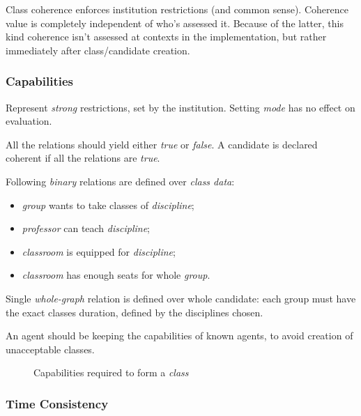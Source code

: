 \documentclass[../ThesisDoc]{subfiles}
\begin{document}
\providecommand{\rootdir}{..}



Class coherence enforces institution restrictions (and common sense).
Coherence value is completely independent of who's assessed it.
Because of the latter, this kind coherence isn't assessed at contexts
in the implementation, but rather immediately after class/candidate creation.

\subsubsection{Capabilities}

Represent \emph{strong} restrictions, set by the institution.
Setting \emph{mode} has no effect on evaluation.

All the relations should yield either \emph{true} or \emph{false}.
A candidate is declared coherent if all the relations are \emph{true}.

Following \emph{binary} relations are defined over \emph{class data}:
\begin{itemize}
  \item \emph{group} wants to take classes of \emph{discipline};
  \item \emph{professor} can teach \emph{discipline};
  \item \emph{classroom} is equipped for \emph{discipline};
  \item \emph{classroom} has enough seats for whole \emph{group}.
\end{itemize}

Single \emph{whole-graph} relation is defined over whole candidate:
each group must have the exact classes duration, defined by the disciplines chosen.

An agent should be keeping the capabilities of known agents, to avoid creation
of unacceptable classes.

\begin{figure}[h]
  \centering
  
  \caption{Capabilities required to form a \emph{class}}
  \label{fig:capabilities}
\end{figure}


\subsubsection{Time Consistency}
\end{document}
